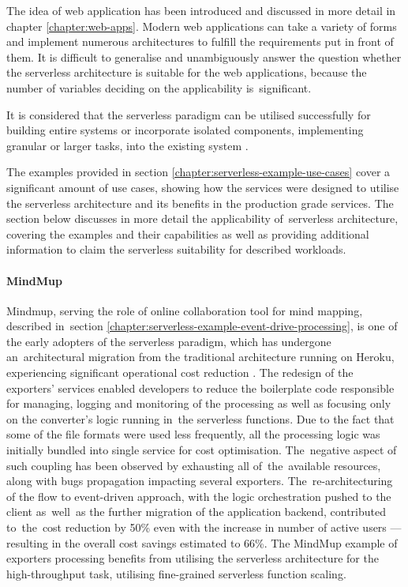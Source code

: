 The idea of web application has been introduced and discussed in more detail in chapter \ref{chapter:web-apps}. Modern web applications can take a variety of forms and implement numerous architectures to fulfill the requirements put in front of them.
It is difficult to generalise and unambiguously answer the question whether the serverless architecture is suitable for the web applications, because the number of variables deciding on the applicability is~significant.

It is considered that the serverless paradigm can be utilised successfully for building entire systems or incorporate isolated components, implementing granular or larger tasks, into the existing system \cite{ServerlessArchitectureOnAWS}.

The examples provided in section \ref{chapter:serverless-example-use-cases} cover a significant amount of use cases, showing how the services were designed to utilise the serverless architecture and its benefits in the production grade services. The section below discusses in more detail the applicability of~serverless architecture, covering the examples and their capabilities as well as providing additional information to claim the serverless suitability for described workloads.

\paragraph{MindMup} \label{chapter:serverless-suitability-mindmup}

Mindmup, serving the role of online collaboration tool for mind mapping, described in~section \ref{chapter:serverless-example-event-drive-processing}, is one of the early adopters of the serverless paradigm, which has undergone an~architectural migration from the traditional architecture running on Heroku, experiencing significant operational cost reduction \cite{ServerlessComputingEconomicAndArchitecturalImpact}.
The redesign of the exporters' services enabled developers to reduce the boilerplate code responsible for managing, logging and monitoring of the processing as well as focusing only on the converter's logic running in~the serverless functions.
Due to the fact that some of the file formats were used less frequently, all the processing logic was initially bundled into single service for cost optimisation. The~negative aspect of such coupling has been observed by exhausting all of~the~available resources, along with bugs propagation impacting several exporters.
The~re-architecturing of the flow to event-driven approach, with the logic orchestration pushed to the client as~well~as the further migration of the application backend, contributed to~the~cost reduction by 50\% even with the increase in number of active users --- resulting in the overall cost savings estimated to 66\%.
The MindMup example of exporters processing benefits from utilising the serverless architecture for the high-throughput task, utilising fine-grained serverless function scaling.

